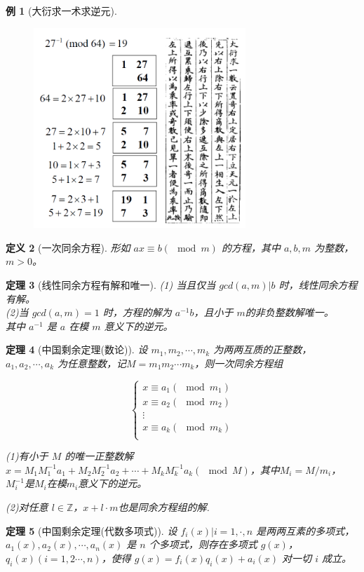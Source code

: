\documentclass[10t, a4paper, oneside]{ctexbook}
\newtheorem{theorem}{定理}[section]
\newtheorem{definition}[theorem]{定义}
\newtheorem{example}[theorem]{例}
\begin{document}
\begin{example}[大衍求一术求逆元]

    \begin{figure}[H]
        \centering
        \includegraphics[width=8cm]{assets/大衍求一术.png}
    \end{figure}

\end{example}
\begin{definition}[一次同余方程]
    形如 $ax\equiv b(\mod m)$ 的方程，其中 $a,b,m$ 为整数，$m>0$。
\end{definition}

\begin{theorem}[线性同余方程有解和唯一]    
(1) 当且仅当 $gcd(a,m)|b$ 时，线性同余方程有解。\\
(2)当 $gcd(a,m)=1$ 时，方程的解为 $a^{-1}b$，且小于 $m$的非负整数解唯一。\\
其中 $a^{-1}$ 是 $a$ 在模 $m$ 意义下的逆元。      
\end{theorem}

\begin{theorem}[中国剩余定理(数论)]
    设 $m_1,m_2,\cdots,m_k$ 为两两互质的正整数，$a_1,a_2,\cdots,a_k$ 为任意整数，记$M = m_1m_2\cdots m_k$，则一次同余方程组

    $$
    \begin{cases}
    x\equiv a_1(\mod m_1)\\
    x\equiv a_2(\mod m_2)\\
    \vdots\\
    x\equiv a_k(\mod m_k)\\
    \end{cases}
    $$

    (1)有小于 $M$ 的唯一正整数解$x=M_1M_1^{-1}a_1+M_2M_2^{-1}a_2+\cdots+M_kM_k^{-1}a_k(\mod M)$，其中$M_i=M/m_i$，$M_i^{-1}$是$M_i$在模$m_i$意义下的逆元。 
    
    (2)对任意 $l\in\mathbb{Z}$，$x+l\cdot m$也是同余方程组的解.
\end{theorem}
\begin{theorem}[中国剩余定理(代数多项式)]
    设 ${f_i(x)|i = 1,\cdot,n}$ 是两两互素的多项式， $a_1(x), a_2(x),\cdots,a_n(x)$ 是 $n$ 个多项式，则存在多项式 $g(x)$，$q_i(x)(i= 1,2\cdots, n)$，使得 $g(x) = f_i(x)q_i(x) + a_i(x)$ 对一切 $i$ 成立。   
\end{theorem}
\end{document}
